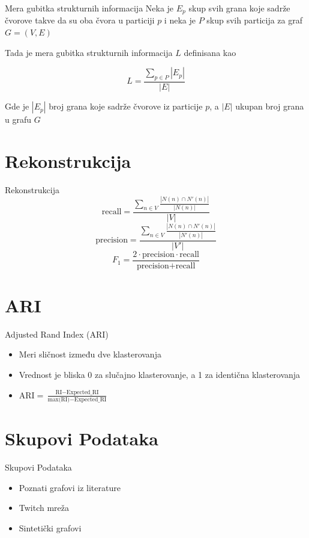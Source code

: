 \documentclass{beamer}
\begin{document}
\begin{frame}{Mera gubitka strukturnih informacija}
    Neka je $ E_p $ skup svih grana koje sadrže čvorove takve da su oba čvora u particiji $ p $  i neka je $ P $ skup svih particija za graf $ G = (V, E) $

    Tada je mera gubitka strukturnih informacija $ L $ definisana kao

    $$ L = \frac{\sum_{p \in P} |E_p|}{|E|} $$

    Gde je $ |E_p| $ broj grana koje sadrže čvorove iz particije $ p $, a $ |E| $ ukupan broj grana u grafu $ G $
\end{frame}

\section{Rekonstrukcija}
\begin{frame}{Rekonstrukcija}
    $$ \text{recall} = \frac{\sum_{n \in V} \frac{|N(n) \cap N'(n)|}{|N(n)|}}{|V|} $$
    $$ \text{precision} = \frac{\sum_{n \in V} \frac{|N(n) \cap N'(n)|}{|N'(n)|}}{|V'|} $$
    $$ F_1 = \frac{2 \cdot \text{precision} \cdot \text{recall}}{\text{precision} + \text{recall}} $$
\end{frame}


\section{ARI}
\begin{frame}{Adjusted Rand Index (ARI)}
    \begin{itemize}
        \item Meri sličnost između dve klasterovanja
        \item Vrednost je bliska 0 za slučajno klasterovanje, a 1 za identična klasterovanja
        \item $ \text{ARI} = \frac{\text{RI} - \text{Expected\_RI}}{\text{max(RI)} - \text{Expected\_RI}} $
    \end{itemize}
\end{frame}

\section{Skupovi Podataka}
\begin{frame}{Skupovi Podataka}
    \begin{itemize}
        \item Poznati grafovi iz literature 
        \item Twitch mreža
        \item Sintetički grafovi 
    \end{itemize}
\end{frame}
\end{document}
